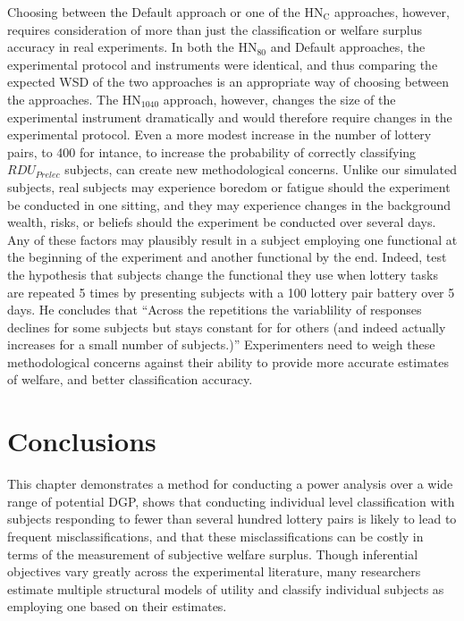 \documentclass[../main.tex]{subfiles}
\begin{document}
Choosing between the Default approach or one of the $\text{HN}_\text{C}$ approaches, however, requires consideration of more than just the classification or welfare surplus accuracy in real experiments.
In both the $\text{HN}_{80}$ and Default approaches, the experimental protocol and instruments were identical, and thus comparing the expected WSD of the two approaches is an appropriate way of choosing between the approaches.
The $\text{HN}_{1040}$ approach, however, changes the size of the experimental instrument dramatically and would therefore require changes in the experimental protocol.
Even a more modest increase in the number of lottery pairs, to 400 for intance, to increase the probability of correctly classifying $\mathit{RDU_{Prelec}}$ subjects, can create new methodological concerns.
Unlike our simulated subjects, real subjects may experience boredom or fatigue should the experiment be conducted in one sitting, and they may experience changes in the background wealth, risks, or beliefs should the experiment be conducted over several days.
Any of these factors may plausibly result in a subject employing one functional at the beginning of the experiment and another functional by the end.
Indeed, \textcite{Hey2001} test the hypothesis that subjects change the functional they use when lottery tasks are repeated 5 times by presenting subjects with a 100 lottery pair battery over 5 days.
He concludes that \enquote{Across the repetitions the variablility of responses declines for some subjects but stays constant for for others (and indeed actually increases for a small number of subjects.)}
Experimenters need to weigh these methodological concerns against their ability to provide more accurate estimates of welfare, and better classification accuracy.

\section{Conclusions}

This chapter demonstrates a method for conducting a power analysis over a wide range of potential DGP, shows that conducting individual level classification with subjects responding to fewer than several hundred lottery pairs is likely to lead to frequent misclassifications, and that these misclassifications can be costly in terms of the measurement of subjective welfare surplus.
Though inferential objectives vary greatly across the experimental literature, many researchers estimate multiple structural models of utility and classify individual subjects as employing one based on their estimates.
\end{document}
